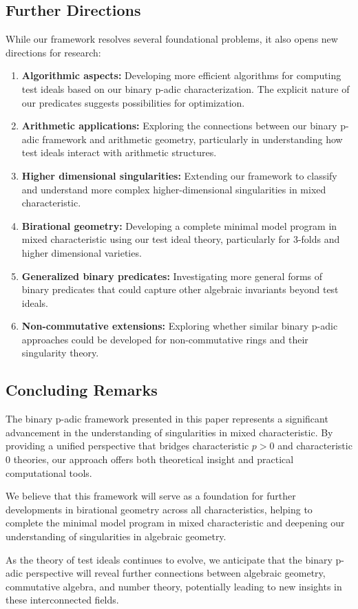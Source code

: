\subsection{Further Directions}

While our framework resolves several foundational problems, it also opens new directions for research:

\begin{enumerate}
    \item \textbf{Algorithmic aspects:} Developing more efficient algorithms for computing test ideals based on our binary p-adic characterization. The explicit nature of our predicates suggests possibilities for optimization.
    
    \item \textbf{Arithmetic applications:} Exploring the connections between our binary p-adic framework and arithmetic geometry, particularly in understanding how test ideals interact with arithmetic structures.
    
    \item \textbf{Higher dimensional singularities:} Extending our framework to classify and understand more complex higher-dimensional singularities in mixed characteristic.
    
    \item \textbf{Birational geometry:} Developing a complete minimal model program in mixed characteristic using our test ideal theory, particularly for 3-folds and higher dimensional varieties.
    
    \item \textbf{Generalized binary predicates:} Investigating more general forms of binary predicates that could capture other algebraic invariants beyond test ideals.
    
    \item \textbf{Non-commutative extensions:} Exploring whether similar binary p-adic approaches could be developed for non-commutative rings and their singularity theory.
\end{enumerate}

\subsection{Concluding Remarks}

The binary p-adic framework presented in this paper represents a significant advancement in the understanding of singularities in mixed characteristic. By providing a unified perspective that bridges characteristic $p > 0$ and characteristic 0 theories, our approach offers both theoretical insight and practical computational tools.

We believe that this framework will serve as a foundation for further developments in birational geometry across all characteristics, helping to complete the minimal model program in mixed characteristic and deepening our understanding of singularities in algebraic geometry.

As the theory of test ideals continues to evolve, we anticipate that the binary p-adic perspective will reveal further connections between algebraic geometry, commutative algebra, and number theory, potentially leading to new insights in these interconnected fields. 